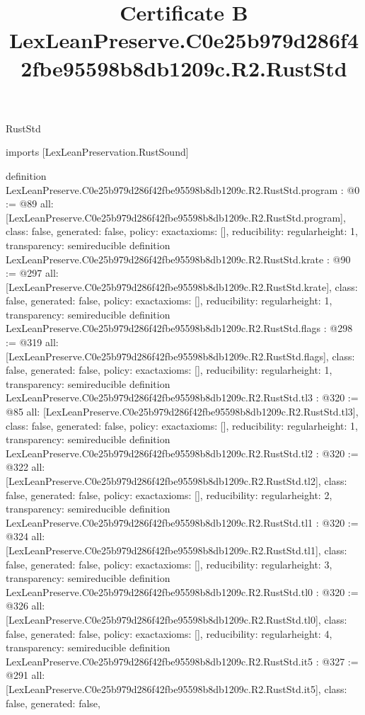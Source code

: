 \begin{lexlean}{RustStd}
\title{Certificate B LexLeanPreserve.C0e25b979d286f42fbe95598b8db1209c.R2.RustStd}
\begin{coremodule}
imports [LexLeanPreservation.RustSound]

definition LexLeanPreserve.C0e25b979d286f42fbe95598b8db1209c.R2.RustStd.program : @0 := @89 {
  all: [LexLeanPreserve.C0e25b979d286f42fbe95598b8db1209c.R2.RustStd.program],
  class: false,
  generated: false,
  policy: exact{axioms: []},
  reducibility: regular{height: 1},
  transparency: semireducible
}
definition LexLeanPreserve.C0e25b979d286f42fbe95598b8db1209c.R2.RustStd.krate : @90 := @297 {
  all: [LexLeanPreserve.C0e25b979d286f42fbe95598b8db1209c.R2.RustStd.krate],
  class: false,
  generated: false,
  policy: exact{axioms: []},
  reducibility: regular{height: 1},
  transparency: semireducible
}
definition LexLeanPreserve.C0e25b979d286f42fbe95598b8db1209c.R2.RustStd.flags : @298 := @319 {
  all: [LexLeanPreserve.C0e25b979d286f42fbe95598b8db1209c.R2.RustStd.flags],
  class: false,
  generated: false,
  policy: exact{axioms: []},
  reducibility: regular{height: 1},
  transparency: semireducible
}
definition LexLeanPreserve.C0e25b979d286f42fbe95598b8db1209c.R2.RustStd.tl3 : @320 := @85 {
  all: [LexLeanPreserve.C0e25b979d286f42fbe95598b8db1209c.R2.RustStd.tl3],
  class: false,
  generated: false,
  policy: exact{axioms: []},
  reducibility: regular{height: 1},
  transparency: semireducible
}
definition LexLeanPreserve.C0e25b979d286f42fbe95598b8db1209c.R2.RustStd.tl2 : @320 := @322 {
  all: [LexLeanPreserve.C0e25b979d286f42fbe95598b8db1209c.R2.RustStd.tl2],
  class: false,
  generated: false,
  policy: exact{axioms: []},
  reducibility: regular{height: 2},
  transparency: semireducible
}
definition LexLeanPreserve.C0e25b979d286f42fbe95598b8db1209c.R2.RustStd.tl1 : @320 := @324 {
  all: [LexLeanPreserve.C0e25b979d286f42fbe95598b8db1209c.R2.RustStd.tl1],
  class: false,
  generated: false,
  policy: exact{axioms: []},
  reducibility: regular{height: 3},
  transparency: semireducible
}
definition LexLeanPreserve.C0e25b979d286f42fbe95598b8db1209c.R2.RustStd.tl0 : @320 := @326 {
  all: [LexLeanPreserve.C0e25b979d286f42fbe95598b8db1209c.R2.RustStd.tl0],
  class: false,
  generated: false,
  policy: exact{axioms: []},
  reducibility: regular{height: 4},
  transparency: semireducible
}
definition LexLeanPreserve.C0e25b979d286f42fbe95598b8db1209c.R2.RustStd.it5 : @327 := @291 {
  all: [LexLeanPreserve.C0e25b979d286f42fbe95598b8db1209c.R2.RustStd.it5],
  class: false,
  generated: false,
}
\end{coremodule}
\end{lexlean}
